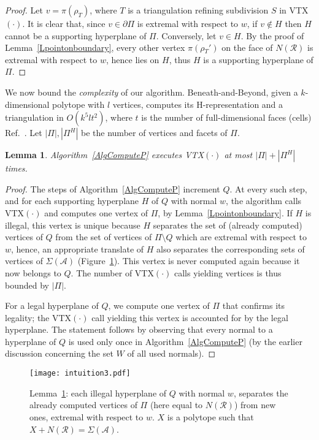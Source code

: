 \documentclass{article}
\newtheorem{lemma}{Lemma}
\newcommand\refcite[1]{\citealp{#1}} \newcommand\citess[1]{\textsuperscript{\textup{\citealp{#1}}}}
\def\A{{\mathcal A}} \def\R{{\mathcal R}}
\begin{document}
\begin{proof}
Let $v=\pi(\rho_T)$, where $T$ is a
triangulation refining subdivision $S$ in {VTX}$(\cdot)$.
It is clear that, since $v\in \partial\varPi$ is extremal with respect to $w$,
if $v\not\in H$ then $H$ cannot be a supporting hyperplane of $\varPi$.
Conversely, let $v\in H$.
By the proof of Lemma~\ref{Lpointonboundary}, every other vertex
$\pi(\rho{_T'})$ 
on the face of $N(\R)$ is extremal with respect to $w$, hence lies on $H$,
thus $H$ is a supporting hyperplane of $\varPi$.
\end{proof}

We now bound the {\it complexity} of our algorithm.
Beneath-and-Beyond, given a $k$-dimensional polytope with
$l$ vertices, computes its H-representation and a triangulation
in $O(k^5lt^2)$, where $t$ is the number of full-dimensional faces (cells)
Ref.~\refcite{Josw03bb}.
Let $|\varPi|, |\varPi^H|$ be the number of vertices and facets of $\varPi$.

\begin{lemma}\label{Loneperhplane}
Algorithm~\ref{AlgComputeP} 
executes {VTX}$(\cdot)$
at most $|\varPi| +|\varPi^H|$ 
times.
\end{lemma}
\begin{proof}
The steps of Algorithm~\ref{AlgComputeP} increment $Q$.
At every such step, and for each supporting hyperplane $H$ of $Q$ with normal
$w$, 
the algorithm calls {VTX}$(\cdot)$
and computes one vertex of $\varPi$, 
by Lemma~\ref{Lpointonboundary}.
If $H$ is illegal, this vertex is unique 
because $H$ separates the set of (already computed) vertices of $Q$ from the set
of vertices of $\varPi\setminus Q$ which are extremal with respect to $w$,
hence, an appropriate translate of $H$ also separates the corresponding sets of
vertices of $\Sigma(\A)$ (Figure~\ref{fig:oneperhplane}).
This vertex is never computed again because it now belongs to $Q$.
The number of {VTX}$(\cdot)$ calls
yielding vertices is thus bounded by $|\varPi|$.

For a legal hyperplane of $Q$, we compute one vertex of $\varPi$
that confirms its legality; the 
{VTX}$(\cdot)$ call
yielding this vertex is accounted for by the legal hyperplane.
The statement follows by observing that 
every normal to a hyperplane of $Q$ is used only once
in Algorithm~\ref{AlgComputeP}
(by the earlier discussion concerning the set $W$ of all used normals).
\end{proof}

\begin{figure}[t]
\centering
\texttt{[image: intuition3.pdf]}
\caption{Lemma~\ref{Loneperhplane}: each illegal hyperplane of $Q$ with normal
$w$, separates
the already computed vertices of $\varPi$ (here equal to $N(\R)$) from new ones,
extremal with respect to $w$. $X$ is a polytope
such that $X+N(\R)=\Sigma(\A)$.}
\label{fig:oneperhplane}
\end{figure}
\end{document}
